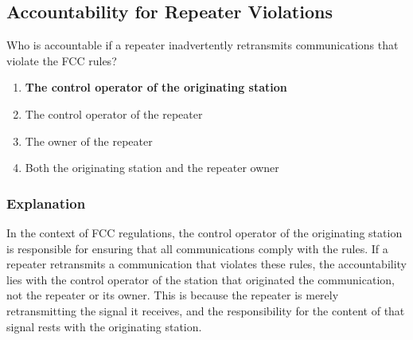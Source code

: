 \subsection{Accountability for Repeater Violations}
\label{T1F10}

\begin{tcolorbox}[colback=gray!10!white,colframe=black!75!black,title=T1F10]
Who is accountable if a repeater inadvertently retransmits communications that violate the FCC rules?
\begin{enumerate}[label=\Alph*),noitemsep]
    \item \textbf{The control operator of the originating station}
    \item The control operator of the repeater
    \item The owner of the repeater
    \item Both the originating station and the repeater owner
\end{enumerate}
\end{tcolorbox}

\subsubsection*{Explanation}
In the context of FCC regulations, the control operator of the originating station is responsible for ensuring that all communications comply with the rules. If a repeater retransmits a communication that violates these rules, the accountability lies with the control operator of the station that originated the communication, not the repeater or its owner. This is because the repeater is merely retransmitting the signal it receives, and the responsibility for the content of that signal rests with the originating station.